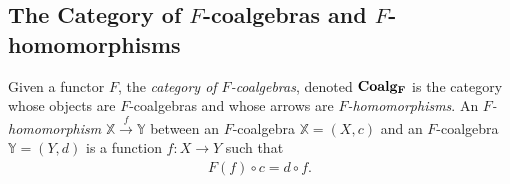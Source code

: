 %
%
%
\subsection{The Category of $F$-coalgebras and $F$-homomorphisms}
Given a functor $F$, the \emph{category of $F$-coalgebras}, denoted $\AsCategory{Coalg_F}$ is the category whose objects are $F$-coalgebras and whose arrows are \emph{$F$-homomorphisms}. An \emph{$F$-homomorphism} $\mathbb{X}\xrightarrow{f} \mathbb{Y}$ between an $F$-coalgebra $\mathbb{X}=(X,c)$ and an $F$-coalgebra $\mathbb{Y}=(Y,d)$ is a function $f\colon X\rightarrow Y$ such that
\begin{align}
    F(f)\circ c = d\circ f.
\end{align}

